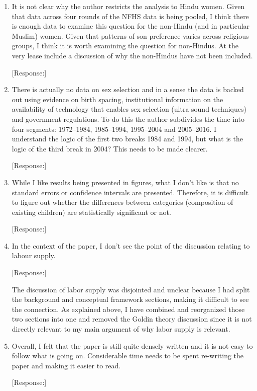 \documentclass[letterpaper,12pt]{article}
\begin{document}
\begin{enumerate}

\item It is not clear why the author restricts the analysis to Hindu
women. Given that data across four rounds of the NFHS data is being
pooled, I think there is enough data to examine this question for the
non-Hindu (and in particular Muslim) women. Given that patterns of son
preference varies across religious groups, I think it is worth examining
the question for non-Hindus. At the very lease include a discussion of
why the non-Hindus have not been included.

[Response:]

\item There is actually no data on sex selection and in a sense the data
is backed out using evidence on birth spacing, institutional information
on the availability of technology that enables sex selection (ultra
sound techniques) and government regulations. To do this the author
subdivides the time into four segments: 1972--1984, 1985--1994, 1995--2004
and 2005--2016. I understand the logic of the first two breaks 1984 and
1994, but what is the logic of the third break in 2004? This needs to be
made clearer.

[Response:]

\item While I like results being presented in figures, what I don’t like
is that no standard errors or confidence intervals are presented.
Therefore, it is difficult to figure out whether the differences between
categories (composition of existing children) are statistically
significant or not.

[Response:]

\item In the context of the paper, I don’t see the point of the
discussion relating to labour supply.

[Response:]

The discussion of labor supply was disjointed and unclear because I had split the 
background and conceptual framework sections, making it difficult to see the connection.
As explained above, I have combined and reorganized those two sections into one and
removed the Goldin theory discussion since it is not directly relevant to my main
argument of why labor supply is relevant.


\item Overall, I felt that the paper is still quite densely written and
it is not easy to follow what is going on. Considerable time needs to be
spent re-writing the paper and making it easier to read.

[Response:]

\end{enumerate}



\newpage


\end{document}
